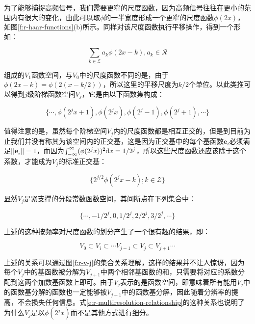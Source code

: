 为了能够捕捉高频信号，我们需要更窄的尺度函数，因为高频信号往往在更小的范围内有很大的变化，由此可以取$\phi$的一半宽度形成一个更窄的尺度函数$\phi(2x)$，如图\ref{f:r-haar-functions}(b)所示。同样对该尺度函数执行平移操作，得到一个形如：

\begin{equation}
	\sum_{k\in \mathcal{Z}}a_k\phi(2x-k),a_k\in \mathcal{R}
\end{equation}

\noindent 组成的$V_1$函数空间，与$V_0$中的尺度函数不同的是，由于$\phi(2x-k)=\phi(2(x-k/2))$，所以这里的平移尺度为$k/2$个单位。以此类推可以得到$j$级阶梯函数空间$V_j$，它是由以下函数集构成：

\begin{equation}
	\{\cdots,\phi(2^{j}x+1),\phi(2^{j}x),\phi(2^{j}-1),\phi(2^{j}+1),\cdots\}
\end{equation}

值得注意的是，虽然每个阶梯空间$V_j$内的尺度函数都是相互正交的，但是到目前为止我们并没有称其为该空间内的正交基，这是因为正交基中的每个基函数$\mathbf{e}_i$必须满足$||\mathbf{e}_i||=1$，而因为$\int^{\infty}_{-\infty}(\phi(2^{j}x))^{2}{\rm d}x=1/2^{j}$，所以这些尺度函数还应该除于这个系数，才能成为$V_j$的标准正交基：

\begin{equation}
	\{2^{j/2}\phi(2^{j}x-k);k\in\mathcal{Z}\}
\end{equation}

显然$V_j$是紧支撑的分段常数函数空间，其间断点在下列集合中：

\begin{equation}
	\{\cdots,-1/2^{j},0,1/2^{j},2/2^{j},3/2^{j},\cdots\}
\end{equation}

上述的这种按频率对尺度函数的划分产生了一个很有趣的结果，即：

\begin{equation}\label{e:r-multiresolution-relationship}
	V_0\subset V_i\subset\cdots V_{j-1}\subset V_j\subset V_{j+1}\cdots
\end{equation}

上述的关系可以通过图\ref{f:r-v-j}的集合关系理解，这样的结果并不让人惊讶，因为每个$V_j$中的基函数被分解为$V_{j+1}$中两个相邻基函数的和，只需要将对应的系数分配到这两个加数基函数上即可。由于$V_j$表示的是函数空间，即意味着所有能用$V_j$中的函数基分解的函数也一定能够被$V_{j+1}$中的函数基分解，因此随着分辨率的提高，不会损失任何信息。式\ref{e:r-multiresolution-relationship}的这种关系也说明了为什么$V_j$是以$\phi(2^{j}x)$而不是其他方式进行细分。

